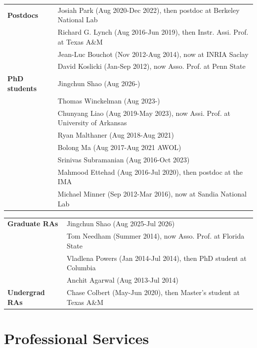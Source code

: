 \documentclass[11pt]{article}
\begin{document}
\begin{tabular}{ll}
{\bf Postdocs \phantom{PhDS}\;} 
& Josiah Park (Aug 2020-Dec 2022), then postdoc at Berkeley National Lab\\
& Richard  G.  Lynch (Aug 2016-Jun 2019), then Instr. Assi. Prof. at Texas A\&M\\
& Jean-Luc Bouchot (Nov 2012-Aug 2014),
now at INRIA Saclay\\
& David Koslicki (Jan-Sep 2012), now 
Asso. Prof. at Penn State\\

{\bf PhD students\;}  
& Jingchun Shao (Aug 2026-)\\
& Thomas Winckelman (Aug 2023-)\\
& Chunyang Liao (Aug 2019-May 2023), now Assi. Prof. at University of Arkansas\\
& Ryan Malthaner (Aug 2018-Aug 2021)\\
& Bolong Ma (Aug 2017-Aug 2021 AWOL)\\
& Srinivas Subramanian (Aug 2016-Oct 2023) \\
& Mahmood Ettehad (Aug 2016-Jul 2020), then postdoc at the IMA\\
& Michael Minner (Sep 2012-Mar 2016), now at Sandia National Lab\\
\end{tabular}

\begin{tabular}{ll}
{\bf Graduate RAs} & Jingchun Shao (Aug 2025-Jul 2026)\\
& Tom Needham (Summer 2014), now Asso. Prof. at Florida State\\
& Vladlena Powers (Jan 2014-Jul 2014), then PhD student at Columbia\\
& Anchit Agarwal (Aug 2013-Jul 2014)\\
{\bf Undergrad RAs} & Chase Colbert (May-Jun 2020), then Master's student at Texas A\&M
\end{tabular}


\section{Professional Services}
\end{document}
